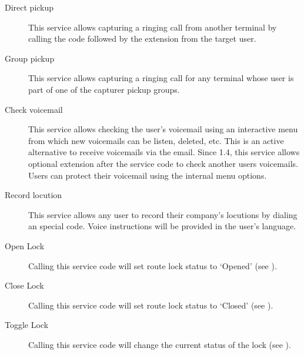 \documentclass[letterpaper,10pt,english]{sphinxmanual}
\begin{document}
\noindent{}
\begin{description}
\item[{Direct pickup}] \leavevmode{}\label{pbx_features/services:term-direct-pickup}
This service allows capturing a ringing call from another terminal by
calling the code followed by the extension from the target user.

\item[{Group pickup}] \leavevmode{}\label{pbx_features/services:term-group-pickup}
This service allows capturing a ringing call for any terminal whose user
is part of one of the capturer pickup groups.

\item[{Check voicemail}] \leavevmode{}\label{pbx_features/services:term-check-voicemail}
This service allows checking the user's voicemail using an interactive
menu from which new voicemails can be listen, deleted, etc. This is an
active alternative to receive voicemails via the email. Since 1.4, this
service allows optional extension after the service code to check
another users voicemails. Users can protect their voicemail using the
internal menu options.

\item[{Record locution}] \leavevmode{}\label{pbx_features/services:term-record-locution}
This service allows any user to record their company's locutions by
dialing an special code. Voice instructions will be provided in the
user's language.

\item[{Open Lock}] \leavevmode{}\label{pbx_features/services:term-open-lock}
Calling this service code will set route lock status to `Opened' (see {\hyperref[pbx_features/route_locks:route\string-locks]{}}).

\item[{Close Lock}] \leavevmode{}\label{pbx_features/services:term-close-lock}
Calling this service code will set route lock status to `Closed' (see {\hyperref[pbx_features/route_locks:route\string-locks]{}}).

\item[{Toggle Lock}] \leavevmode{}\label{pbx_features/services:term-toggle-lock}
Calling this service code will change the current status of the lock (see {\hyperref[pbx_features/route_locks:route\string-locks]{}}).

\end{description}
\end{document}
